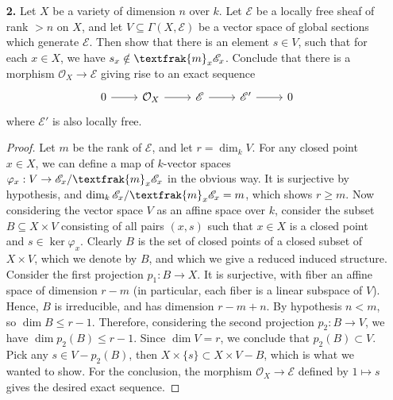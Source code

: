 \documentclass{article}
\newcommand{\goth}[1]{\textfrak{#1}}
\newcommand{\fE}{\mathscr{E}}
\newcommand{\fO}{\mathcal{O}}
\newcommand{\gm}{\goth{m}}
\begin{document}
\begin{enumerate} [label=\textbf{\arabic*.}, leftmargin=0em]
\item[\textbf{2.}] Let $X$ be a variety of dimension $n$ over $k$. Let $\fE$ be a locally free sheaf of rank $> n$ on $X$, and let $V \subseteq \Gamma(X, \fE)$ be a vector space of global sections which generate $\fE$. Then show that there is an element $s \in V$, such that for each $x \in X$, we have $s_x \notin \goth{m}_x \fE_x$. Conclude that there is a morphism $\fO_X \to \fE$ giving rise to an exact sequence
\[ \begin{tikzcd}
    0 \arrow[r] & \fO_X \arrow[r] & \fE \arrow[r] & \fE' \arrow[r] & 0
    \end{tikzcd} \]
where $\fE'$ is also locally free.

\begin{proof}
Let $m$ be the rank of $\fE$, and let $r = \dim_k{V}$. For any closed point $x \in X$, we can define a map of $k$-vector spaces $\varphi_x : V \to \fE_x / \gm_x \fE_x$ in the obvious way. It is surjective by hypothesis, and $\dim_k \fE_x / \gm_x \fE_x = m$, which shows $r \geq m$. Now considering the vector space $V$ as an affine space over $k$, consider the subset $B \subseteq X \times V$ consisting of all pairs $(x, s)$ such that $x \in X$ is a closed point and $s \in \ker{\varphi_x}$. Clearly $B$ is the set of closed points of a closed subset of $X \times V$, which we denote by $B$, and which we give a reduced induced structure. Consider the first projection $p_1 : B \to X$. It is surjective, with fiber an affine space of dimension $r - m$ (in particular, each fiber is a linear subspace of $V$). Hence, $B$ is irreducible, and has dimension $r - m + n$. By hypothesis $n < m$, so $\dim{B} \leq r - 1$. Therefore, considering the second projection $p_2 : B \to V$, we have $\dim p_2(B) \leq r - 1$. Since $\dim{V} = r$, we conclude that $p_2(B) \subset V$. Pick any $s \in V - p_2(B)$, then $X \times \{s\} \subset X \times V - B$, which is what we wanted to show. For the conclusion, the morphism $\fO_X \to \fE$ defined by $1 \mapsto s$ gives the desired exact sequence.
\end{proof}


\end{enumerate}
\end{document}
